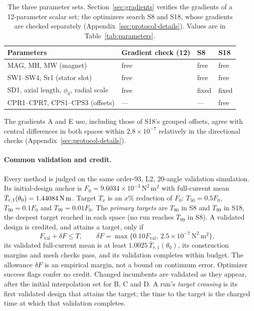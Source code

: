 \begin{table}[H]\centering\small
\caption{The three parameter sets. Section~\ref{sec:gradients} verifies
the gradients of a 12-parameter scalar set; the optimizers search S8 and
S18, whose gradients are checked separately
(Appendix~\ref{sec:protocol-details}). Values are in
Table~\ref{tab:parameters}.}
\label{tab:paramsets}
\begin{tabular}{llll}\toprule
Parameters & Gradient check (12) & S8 & S18\\\midrule
MAG, MH, MW (magnet) & free & free & free\\
SW1--SW4, Sr1 (stator slot) & free & free & free\\
SD1, axial length, $\phi_0$, radial scale & free & fixed & fixed\\
CPR1--CPR7, CPS1--CPS3 (offsets) & --- & --- & free\\\bottomrule
\end{tabular}
\end{table}

The gradients A and E use, including those of S18's grouped offsets,
agree with central differences in both spaces within $2.8\times10^{-7}$
relatively in the directional checks (Appendix~\ref{sec:protocol-details}).

\paragraph{Common validation and credit.}
Every method is judged on the same order-93, L2, 20-angle validation simulation.
Its initial-design anchor is $F_0=9.6034\times10^{-3}\,\mathrm{N^2\,m^2}$ with
full-current mean $\bar T_{r,1}(\theta_0)=1.44084\,\mathrm{N\,m}$. Target $T_x$ is an $x$\% reduction
of $F_0$: $T_{50}=0.5F_0$, $T_{90}=0.1F_0$ and $T_{99}=0.01F_0$. The
\emph{primary targets} are $T_{90}$ in S8 and $T_{99}$ in S18, the deepest
target reached in each space (no run reaches $T_{99}$ in S8). A validated
design is credited, and attains a target, only if
\begin{equation}
 F_{\mathrm{val}}+\delta F\leq T,\qquad
 \delta F=\max\{0.10F_{\mathrm{val}},\,2.5\times10^{-7}\,\mathrm{N^2\,m^2}\},
\end{equation}
its validated full-current mean is at least $1.0025\,\bar T_{r,1}(\theta_0)$, its
construction margins and mesh checks pass, and its validation completes
within budget. The allowance $\delta F$ is an empirical margin, not a bound
on continuum error. Optimizer success flags confer no credit. Changed
incumbents are validated as they appear, after the initial interpolation
set for B, C and D. A run's \emph{target crossing} is its first validated
design that attains the target; the time to the target is the charged time
at which that validation completes.

